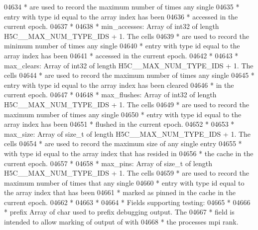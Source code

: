 \begin{DoxyCode}
04634 \textcolor{comment}{ *      are used to record the maximum number of times any single}
04635 \textcolor{comment}{ *      entry with type id equal to the array index has been}
04636 \textcolor{comment}{ *      accessed in the current epoch.}
04637 \textcolor{comment}{ *}
04638 \textcolor{comment}{ * min\_accesses: Array of int32 of length H5C\_\_MAX\_NUM\_TYPE\_IDS + 1.  The cells}
04639 \textcolor{comment}{ *      are used to record the minimum number of times any single}
04640 \textcolor{comment}{ *      entry with type id equal to the array index has been}
04641 \textcolor{comment}{ *      accessed in the current epoch.}
04642 \textcolor{comment}{ *}
04643 \textcolor{comment}{ * max\_clears:  Array of int32 of length H5C\_\_MAX\_NUM\_TYPE\_IDS + 1.  The cells}
04644 \textcolor{comment}{ *      are used to record the maximum number of times any single}
04645 \textcolor{comment}{ *      entry with type id equal to the array index has been cleared}
04646 \textcolor{comment}{ *      in the current epoch.}
04647 \textcolor{comment}{ *}
04648 \textcolor{comment}{ * max\_flushes: Array of int32 of length H5C\_\_MAX\_NUM\_TYPE\_IDS + 1.  The cells}
04649 \textcolor{comment}{ *      are used to record the maximum number of times any single}
04650 \textcolor{comment}{ *      entry with type id equal to the array index has been}
04651 \textcolor{comment}{ *      flushed in the current epoch.}
04652 \textcolor{comment}{ *}
04653 \textcolor{comment}{ * max\_size:    Array of size\_t of length H5C\_\_MAX\_NUM\_TYPE\_IDS + 1.  The cells}
04654 \textcolor{comment}{ *              are used to record the maximum size of any single entry}
04655 \textcolor{comment}{ *      with type id equal to the array index that has resided in}
04656 \textcolor{comment}{ *      the cache in the current epoch.}
04657 \textcolor{comment}{ *}
04658 \textcolor{comment}{ * max\_pins:    Array of size\_t of length H5C\_\_MAX\_NUM\_TYPE\_IDS + 1.  The cells}
04659 \textcolor{comment}{ *              are used to record the maximum number of times that any single}
04660 \textcolor{comment}{ *              entry with type id equal to the array index that has been}
04661 \textcolor{comment}{ *              marked as pinned in the cache in the current epoch.}
04662 \textcolor{comment}{ *}
04663 \textcolor{comment}{ *}
04664 \textcolor{comment}{ * Fields supporting testing:}
04665 \textcolor{comment}{ *}
04666 \textcolor{comment}{ * prefix   Array of char used to prefix debugging output.  The}
04667 \textcolor{comment}{ *      field is intended to allow marking of output of with}
04668 \textcolor{comment}{ *      the processes mpi rank.}

\end{DoxyCode}
